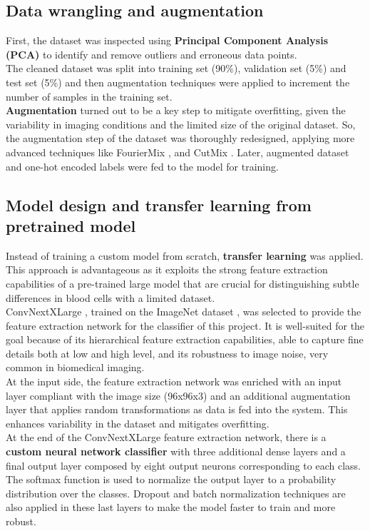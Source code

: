 \documentclass[11pt]{article}
\begin{document}
\begin{multicols}{2}
        \subsection{Data wrangling and augmentation}
        First, the dataset was inspected using \textbf{Principal Component Analysis (PCA)}  \cite{jolliffe2016principal} to identify and remove outliers and erroneous data points.\\ 
        The cleaned dataset was split into training set (90\%), validation set (5\%) and test set (5\%) and then augmentation techniques were applied to increment the number of samples in the training set. \\
        \textbf{Augmentation} turned out to be a key step to mitigate overfitting, given the variability in imaging conditions and the limited size of the original dataset. 
        So, the augmentation step of the dataset was thoroughly redesigned, applying more advanced techniques like FourierMix \cite{fouriermix}, and CutMix \cite{cutmix}.
        Later, augmented dataset and one-hot encoded labels were fed to the model for training. 
        
        \subsection{Model design and transfer learning from pretrained model}
        Instead of training a custom model from scratch, \textbf{transfer learning} was applied.
        This approach is advantageous as it exploits the strong feature extraction capabilities of a pre-trained large model that are crucial for distinguishing subtle differences in blood cells with a limited dataset.\\
        ConvNextXLarge \cite{liu2022convnext}, trained on the ImageNet dataset \cite{deng2009imagenet}, was selected to provide the feature extraction network for the classifier of this project. It is well-suited for the goal because of its hierarchical feature extraction capabilities, able to capture fine details both at low and high level, and its robustness to image noise, very common in biomedical imaging. \cite{keras_applications} \\
        At the input side, the feature extraction network was enriched with an input layer compliant with the image size (96x96x3) and an additional augmentation layer that applies random transformations as data is fed into the system. This enhances variability in the dataset and mitigates overfitting. \\
        At the end of the ConvNextXLarge feature extraction network, there is a \textbf{custom neural network classifier} with three additional dense layers and a final output layer composed by eight output neurons corresponding to each class. The softmax function is used to normalize the output layer to a probability distribution over the classes. Dropout and batch normalization techniques are also applied in these last layers to make the model faster to train and more robust. 

\end{multicols}
\end{document}
